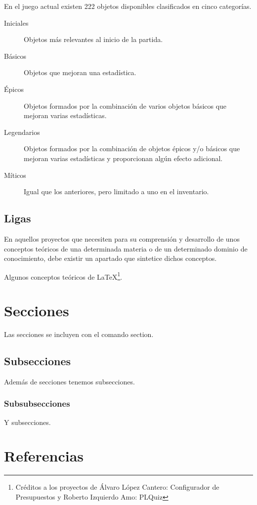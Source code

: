 En el juego actual existen 222 objetos disponibles clasificados en cinco categorías.
\begin{description}
	\item[Iniciales] Objetos más relevantes al inicio de la partida.
	\item[Básicos] Objetos que mejoran una estadística.
	\item[Épicos] Objetos formados por la combinación de varios objetos básicos que mejoran varias estadísticas.
	\item[Legendarios] Objetos formados por la combinación de objetos épicos y/o básicos que mejoran varias estadísticas y proporcionan algún efecto adicional.
	\item[Míticos] Igual que los anteriores, pero limitado a uno en el inventario.
\end{description}


\subsection{Ligas}






En aquellos proyectos que necesiten para su comprensión y desarrollo de unos conceptos teóricos de una determinada materia o de un determinado dominio de conocimiento, debe existir un apartado que sintetice dichos conceptos.

Algunos conceptos teóricos de \LaTeX \footnote{Créditos a los proyectos de Álvaro López Cantero: Configurador de Presupuestos y Roberto Izquierdo Amo: PLQuiz}.

\section{Secciones}

Las secciones se incluyen con el comando section.

\subsection{Subsecciones}

Además de secciones tenemos subsecciones.

\subsubsection{Subsubsecciones}

Y subsecciones.


\section{Referencias}

